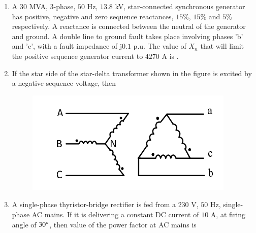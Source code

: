 \documentclass[journal,12pt,onecolumn]{IEEEtran}
\theoremstyle{remark}
\begin{document}
\begin{enumerate}[start=1, label=Q.\arabic*]
    \item A $30$ MVA, 3-phase, $50$ Hz, $13.8$ kV, star-connected synchronous generator has positive, negative and zero sequence reactances, $15\%$, $15\%$ and $5\%$ respectively. A reactance  is connected between the neutral of the generator and ground. A double line to ground fault takes place involving phases 'b' and 'c', with a fault impedance of j$0.1$ p.u. The value of $X_n$  that will limit the positive sequence generator current to $4270$ A is \underline{\hspace{2cm}}.

    \hfill{}

    \item If the star side of the star-delta transformer shown in the figure is excited by a negative sequence voltage, then
    \begin{figure}[H]
        \includegraphics[width=0.4\columnwidth]{Figures/q42.png}
        \centering
        \caption{}
    \end{figure}
    \begin{enumerate}
    \end{enumerate}

    \hfill{}

    \item A single-phase thyristor-bridge rectifier is fed from a $230$ V, $50$ Hz, single-phase AC mains. If it is delivering a constant DC current of $10$ A, at firing angle of $30\degree$, then value of the power factor at AC mains is
    \begin{enumerate}
    \end{enumerate}


\end{enumerate}
\end{document}
